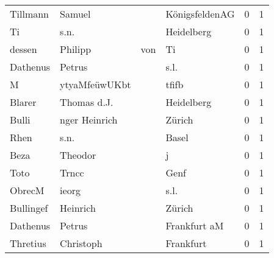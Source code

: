 \documentclass[10pt,a4paper,landscape]{article}
\begin{document}
\begin{longtable}{llllrr}
                 Tillmann &                             Samuel &             &                              KönigsfeldenAG &          0 &         1 \\
                       Ti &                               s.n. &             &                                  Heidelberg &          0 &         1 \\
                   dessen &                            Philipp &         von &                                          Ti &          0 &         1 \\
                 Dathenus &                             Petrus &             &                                        s.l. &          0 &         1 \\
                        M &                      ytyaMfeüwUKbt &             &                                       tfifb &          0 &         1 \\
                   Blarer &                        Thomas d.J. &             &                                  Heidelberg &          0 &         1 \\
                    Bulli &                      nger Heinrich &             &                                      Zürich &          0 &         1 \\
                     Rhen &                               s.n. &             &                                       Basel &          0 &         1 \\
                     Beza &                            Theodor &             &                                           j &          0 &         1 \\
                     Toto &                              Trncc &             &                                        Genf &          0 &         1 \\
                   ObrecM &                              ieorg &             &                                        s.l. &          0 &         1 \\
                Bullingef &                           Heinrich &             &                                      Zürich &          0 &         1 \\
                 Dathenus &                             Petrus &             &                                Frankfurt aM &          0 &         1 \\
                 Thretius &                          Christoph &             &                                   Frankfurt &          0 &         1 \\

\end{longtable}
\end{document}
